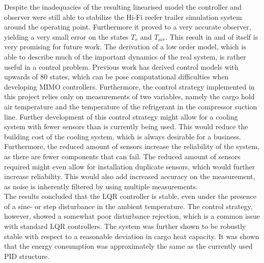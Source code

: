 Despite the inadequacies of the resulting linearised model the controller and observer were still able to stabilize the Hi-Fi reefer trailer simulation system around the operating point. Furthermore it proved to a very accurate observer, yielding a very small error on the states $T_v$ and $T_{air}$. This result in and of itself is very promising for future work. The derivation of a low order model, which is able to describe much of the important dynamics of the real system, is rather useful in a control problem. Previous work has derived control models with upwards of 80 states, which can be pose computational difficulties when developing MIMO controllers. Furthermore, the control strategy implemented in this project relies only on measurements of two variables, namely the cargo hold air temperature and the temperature of the refrigerant in the compressor suction line. Further development of this control strategy might allow for a cooling system with fewer sensors than is currently being used. This would reduce the building cost of the cooling system, which is always desirable for a business. \\

Furthermore, the reduced amount of sensors increase the reliability of the system, as there are fewer components that can fail. The reduced amount of sensors required might even allow for installation duplicate sensors, which would further increase reliability. This would also add increased accuracy on the measurement, as noise is inherently filtered by using multiple measurements.\\

The results concluded that the LQR controller is stable, even under the presence of a sine- or step disturbance in the ambient temperature. The control strategy, however, showed a somewhat poor disturbance rejection, which is a common issue with standard LQR controllers. The system was further shown to be robustly stable with respect to a reasonable deviation in cargo heat capacity. It was shown that the energy consumption was approximately the same as the currently used PID structure.\\


















